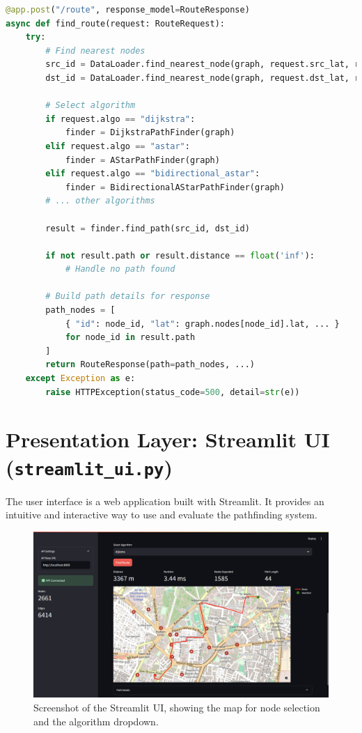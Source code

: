 \documentclass[12pt, a4paper]{report}
\begin{document}
\begin{lstlisting}[language=Python, caption={Code Snippet: `/route' endpoint from `api.py'}, label={lst:route_endpoint}]
@app.post("/route", response_model=RouteResponse)
async def find_route(request: RouteRequest):
    try:
        # Find nearest nodes
        src_id = DataLoader.find_nearest_node(graph, request.src_lat, request.src_lon)
        dst_id = DataLoader.find_nearest_node(graph, request.dst_lat, request.dst_lon)

        # Select algorithm
        if request.algo == "dijkstra":
            finder = DijkstraPathFinder(graph)
        elif request.algo == "astar":
            finder = AStarPathFinder(graph)
        elif request.algo == "bidirectional_astar":
            finder = BidirectionalAStarPathFinder(graph)
        # ... other algorithms

        result = finder.find_path(src_id, dst_id)

        if not result.path or result.distance == float('inf'):
            # Handle no path found
        
        # Build path details for response
        path_nodes = [
            { "id": node_id, "lat": graph.nodes[node_id].lat, ... }
            for node_id in result.path
        ]
        return RouteResponse(path=path_nodes, ...)
    except Exception as e:
        raise HTTPException(status_code=500, detail=str(e))
\end{lstlisting}

\section{Presentation Layer: Streamlit UI (\texttt{streamlit\_ui.py})}

The user interface is a web application built with Streamlit. It provides an intuitive and interactive way to use and evaluate the pathfinding system.

\begin{figure}[h!]
    \centering
    \includegraphics[width=0.9\linewidth]{figures/streamlit_ui.png}
    \caption{Screenshot of the Streamlit UI, showing the map for node selection and the algorithm dropdown.}
    \label{fig:ui}
\end{figure}
\end{document}
